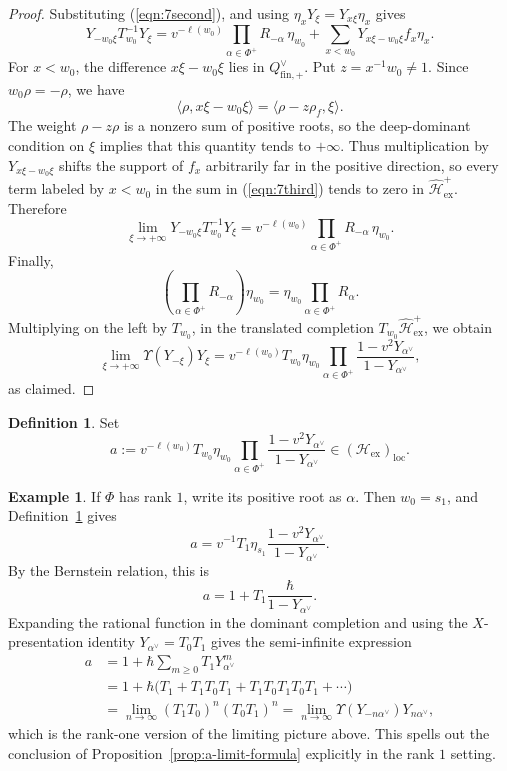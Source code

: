 \documentclass{amsart}
\theoremstyle{definition}
\newtheorem{defi}[Thm]{Definition}
\newtheorem{Ex}[Thm]{Example}
\numberwithin{equation}{section}
\begin{document}
\begin{proof}
Substituting (\ref{eqn:7second}), and using \(\eta_xY_\xi=Y_{x\xi}\eta_x\) gives
\begin{equation}
    Y_{-w_0\xi}T_{w_0}^{-1}Y_\xi
=
v^{-\ell(w_0)}\prod_{\alpha\in\Phi^+}R_{-\alpha}\,\eta_{w_0}
+
\sum_{x<w_0}Y_{x\xi-w_0\xi}f_x\eta_x.\label{eqn:7third}
\end{equation}
For \(x<w_0\), the difference \(x\xi-w_0\xi\) lies in
\(Q_{\mathrm{fin},+}^\vee\). Put \(z=x^{-1}w_0\neq 1\). Since
\(w_0\rho=-\rho\), we have
\[
\langle\rho,x\xi-w_0\xi\rangle
=
\langle\rho-z\rho_f,\xi\rangle.
\]
The weight \(\rho-z\rho\) is a nonzero sum of positive roots, so the
deep-dominant condition on \(\xi\) implies that this quantity tends to
\(+\infty\). Thus multiplication by
\(Y_{x\xi-w_0\xi}\) shifts the support of \(f_x\) arbitrarily far in the
positive direction, so every term labeled by $x<w_0$ in the sum in (\ref{eqn:7third}) tends to zero in
\(\widehat{\mathcal H}_{\mathrm{ex}}^{+}\).
Therefore
\[
\lim_{\xi\to+\infty}
Y_{-w_0\xi}T_{w_0}^{-1}Y_\xi
=
v^{-\ell(w_0)}\prod_{\alpha\in\Phi^+}R_{-\alpha}\,\eta_{w_0}.
\]
Finally,
\[
\left(\prod_{\alpha\in\Phi^+}R_{-\alpha}\right)\eta_{w_0}
=
\eta_{w_0}\prod_{\alpha\in\Phi^+}R_\alpha.
\]
Multiplying on the left by \(T_{w_0}\), in the translated completion
\(T_{w_0}\widehat{\mathcal H}_{\mathrm{ex}}^{+}\), we obtain
\[
\lim_{\xi\to+\infty}\Upsilon(Y_{-\xi})Y_\xi
=
v^{-\ell(w_0)}T_{w_0}\eta_{w_0}
\prod_{\alpha\in\Phi^+}
\frac{1-v^2Y_{\alpha^\vee}}{1-Y_{\alpha^\vee}},
\]
as claimed.
\end{proof}

\begin{defi}\label{def:levelzero-a}
Set
\[
a:=
v^{-\ell(w_0)}T_{w_0}\eta_{w_0}
\prod_{\alpha\in\Phi^+}
\frac{1-v^2Y_{\alpha^\vee}}{1-Y_{\alpha^\vee}}
\in
(\mathcal H_{\mathrm{ex}})_{\mathrm{loc}}.
\]
\end{defi}

\begin{Ex}\label{ex:rank-one-a}
If $\Phi$ has rank $1$, write its positive root as $\alpha$. Then
$w_0=s_1$, and Definition~\ref{def:levelzero-a} gives
\[
a
=
v^{-1}T_1\eta_{s_1}\frac{1-v^2Y_{\alpha^\vee}}{1-Y_{\alpha^\vee}}.
\]
By the Bernstein relation, this is
\[
a = 1+T_1\frac{\hbar}{1-Y_{\alpha^\vee}}.
\]
Expanding the rational function in the dominant completion and using the
\(X\)-presentation identity $Y_{\alpha^\vee}=T_0T_1$ gives the semi-infinite expression
\begin{align*}
a
&=
1+\hbar\sum_{m\geqslant 0}T_1Y_{\alpha^\vee}^m\\
&=
1+\hbar\bigl(T_1+T_1T_0T_1+T_1T_0T_1T_0T_1+\cdots\bigr)\\
&=
\lim_{n\to\infty}(T_1T_0)^n(T_0T_1)^n
=
\lim_{n\to\infty}\Upsilon(Y_{-n\alpha^\vee})Y_{n\alpha^\vee},
\end{align*}
which is the rank-one version of the limiting picture above.
This spells out the conclusion of Proposition~\ref{prop:a-limit-formula} explicitly in the rank $1$ setting.
\end{Ex}
\end{document}
